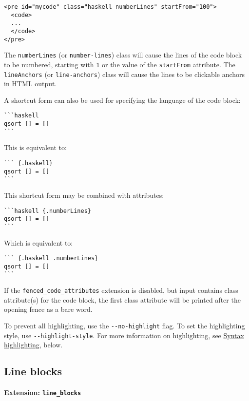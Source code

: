 \documentclass[
  a4paper,
]{article}
\begin{document}
\begin{verbatim}
<pre id="mycode" class="haskell numberLines" startFrom="100">
  <code>
  ...
  </code>
</pre>
\end{verbatim}

The \texttt{numberLines} (or \texttt{number-lines}) class will cause the
lines of the code block to be numbered, starting with \texttt{1} or the
value of the \texttt{startFrom} attribute. The \texttt{lineAnchors} (or
\texttt{line-anchors}) class will cause the lines to be clickable
anchors in HTML output.

A shortcut form can also be used for specifying the language of the code
block:

\begin{verbatim}
```haskell
qsort [] = []
```
\end{verbatim}

This is equivalent to:

\begin{verbatim}
``` {.haskell}
qsort [] = []
```
\end{verbatim}

This shortcut form may be combined with attributes:

\begin{verbatim}
```haskell {.numberLines}
qsort [] = []
```
\end{verbatim}

Which is equivalent to:

\begin{verbatim}
``` {.haskell .numberLines}
qsort [] = []
```
\end{verbatim}

If the \texttt{fenced\_code\_attributes} extension is disabled, but
input contains class attribute(s) for the code block, the first class
attribute will be printed after the opening fence as a bare word.

To prevent all highlighting, use the \texttt{-\/-no-highlight} flag. To
set the highlighting style, use \texttt{-\/-highlight-style}. For more
information on highlighting, see
\protect\hyperlink{syntax-highlighting}{Syntax highlighting}, below.

\hypertarget{line-blocks}{%
\subsection{Line blocks}\label{line-blocks}}

\hypertarget{extension-line_blocks}{%
\paragraph{\texorpdfstring{Extension:
\texttt{line\_blocks}}{Extension: line\_blocks}}\label{extension-line_blocks}}
\end{document}
